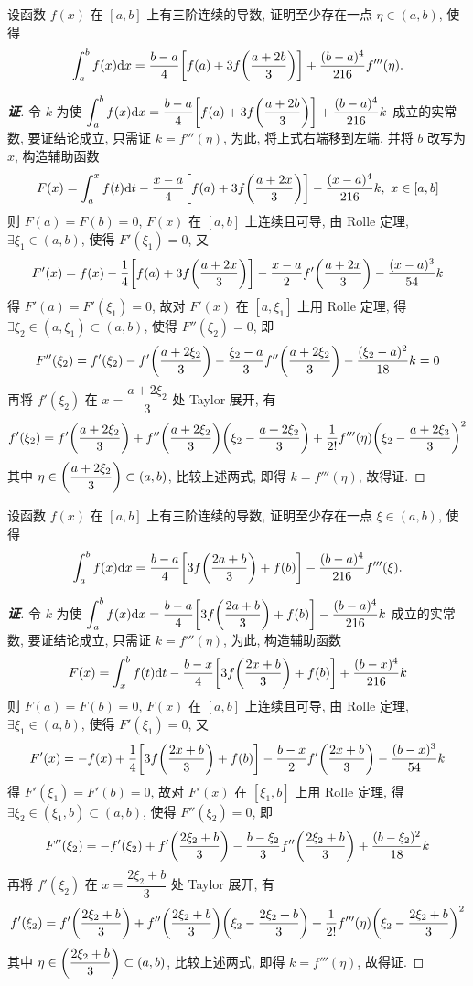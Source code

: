 \begin{example}
    设函数 $f(x)$ 在 $[a,b]$ 上有三阶连续的导数, 证明至少存在一点 $\eta\in(a,b)$, 使得
    $$\int_{a}^{b}f(x)\dd x=\dfrac{b-a}{4}\qty[f(a)+3f\qty(\dfrac{a+2b}{3})]+\dfrac{(b-a)^4}{216}f'''(\eta).$$
\end{example}
\begin{proof}[{\songti \textbf{证}}]
    令 $k$ 为使 $\displaystyle\int_{a}^{b}f(x)\dd x=\dfrac{b-a}{4}\qty[f(a)+3f\qty(\dfrac{a+2b}{3})]+\dfrac{(b-a)^4}{216}k$ 成立的实常数, 要证结论成立, 只需证 $k=f'''(\eta)$,
    为此, 将上式右端移到左端, 并将 $b$ 改写为 $x$, 构造辅助函数
    $$F(x)=\int_{a}^{x}f(t)\dd t-\dfrac{x-a}{4}\qty[f(a)+3f\qty(\dfrac{a+2x}{3})]-\dfrac{(x-a)^4}{216}k,~x\in[a,b]$$
    则 $F(a)=F(b)=0$, $F(x)$ 在 $[a,b]$ 上连续且可导, 由 Rolle 定理, $\exists\xi_1\in(a,b)$, 使得 $F'(\xi_1)=0$, 又
    $$F'(x)=f(x)-\dfrac{1}{4}\qty[f(a)+3f\qty(\dfrac{a+2x}{3})]-\dfrac{x-a}{2}f'\qty(\dfrac{a+2x}{3})-\dfrac{(x-a)^3}{54}k$$
    得 $F'(a)=F'(\xi_1)=0$, 故对 $F'(x)$ 在 $[a,\xi_1]$ 上用 Rolle 定理, 得 $\exists\xi_2\in(a,\xi_1)\subset(a,b)$, 使得 $F''(\xi_2)=0$, 即
    $$F''(\xi_2)=f'(\xi_2)-f'\qty(\dfrac{a+2\xi_2}{3})-\dfrac{\xi_2-a}{3}f''\qty(\dfrac{a+2\xi_2}{3})-\dfrac{(\xi_2-a)^2}{18}k=0$$
    再将 $f'(\xi_2)$ 在 $x=\dfrac{a+2\xi_2}{3}$ 处 Taylor 展开, 有
    $$f'(\xi_2)=f'\qty(\dfrac{a+2\xi_2}{3})+f''\qty(\dfrac{a+2\xi_2}{3})\qty(\xi_2-\dfrac{a+2\xi_2}{3})+\dfrac{1}{2!}f'''(\eta)\qty(\xi_2-\dfrac{a+2\xi_3}{3})^2$$
    其中 $\eta\in\qty(\dfrac{a+2\xi_2}{3})\subset(a,b)$, 比较上述两式, 即得 $k=f'''(\eta)$, 故得证.
\end{proof}

\begin{example}
    设函数 $f(x)$ 在 $[a,b]$ 上有三阶连续的导数, 证明至少存在一点 $\xi\in(a,b)$, 使得
    $$\int_{a}^{b}f(x)\dd x=\dfrac{b-a}{4}\qty[3f\qty(\dfrac{2a+b}{3})+f(b)]-\dfrac{(b-a)^4}{216}f'''(\xi).$$
\end{example}
\begin{proof}[{\songti \textbf{证}}]
    令 $k$ 为使 $\displaystyle \int_{a}^{b}f(x)\dd x=\dfrac{b-a}{4}\qty[3f\qty(\dfrac{2a+b}{3})+f(b)]-\dfrac{(b-a)^4}{216}k$ 成立的实常数, 要证结论成立, 只需证 $k=f'''(\eta)$,
    为此, 构造辅助函数 $$F(x)=\int_{x}^{b}f(t)\dd t-\dfrac{b-x}{4}\qty[3f\qty(\dfrac{2x+b}{3})+f(b)]+\dfrac{(b-x)^4}{216}k$$
    则 $F(a)=F(b)=0$, $F(x)$ 在 $[a,b]$ 上连续且可导, 由 Rolle 定理, $\exists\xi_1\in(a,b)$, 使得 $F'(\xi_1)=0$, 又
    $$F'(x)=-f(x)+\dfrac{1}{4}\qty[3f\qty(\dfrac{2x+b}{3})+f(b)]-\dfrac{b-x}{2}f'\qty(\dfrac{2x+b}{3})-\dfrac{(b-x)^3}{54}k$$
    得 $F'(\xi_1)=F'(b)=0$, 故对 $F'(x)$ 在 $[\xi_1,b]$ 上用 Rolle 定理, 得 $\exists\xi_2\in(\xi_1,b)\subset(a,b)$, 使得 $F''(\xi_2)=0$, 即
    $$F''(\xi_2)=-f'(\xi_2)+f'\qty(\dfrac{2\xi_2+b}{3})-\dfrac{b-\xi_2}{3}f''\qty(\dfrac{2\xi_2+b}{3})+\dfrac{(b-\xi_2)^2}{18}k$$
    再将 $f'(\xi_2)$ 在 $x=\dfrac{2\xi_2+b}{3}$ 处 Taylor 展开, 有
    $$f'(\xi_2)=f'\qty(\dfrac{2\xi_2+b}{3})+f''\qty(\dfrac{2\xi_2+b}{3})\qty(\xi_2-\dfrac{2\xi_2+b}{3})+\dfrac{1}{2!}f'''(\eta)\qty(\xi_2-\dfrac{2\xi_2+b}{3})^2$$
    其中 $\eta\in\qty(\dfrac{2\xi_2+b}{3})\subset(a,b)$, 比较上述两式, 即得 $k=f'''(\eta)$, 故得证.
\end{proof}

